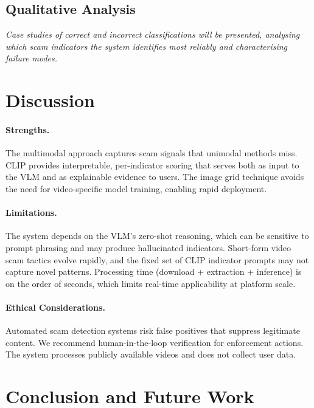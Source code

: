 \documentclass[12pt,a4paper]{article}
\begin{document}
\subsection{Qualitative Analysis}

\emph{Case studies of correct and incorrect classifications will be
presented, analysing which scam indicators the system identifies most
reliably and characterising failure modes.}

\section{Discussion}

\paragraph{Strengths.}
The multimodal approach captures scam signals that unimodal methods miss.
CLIP provides interpretable, per-indicator scoring that serves both as
input to the VLM and as explainable evidence to users. The image grid
technique avoids the need for video-specific model training, enabling
rapid deployment.

\paragraph{Limitations.}
The system depends on the VLM's zero-shot reasoning, which can be
sensitive to prompt phrasing and may produce hallucinated indicators.
Short-form video scam tactics evolve rapidly, and the fixed set of CLIP
indicator prompts may not capture novel patterns. Processing time
(download + extraction + inference) is on the order of seconds, which
limits real-time applicability at platform scale.

\paragraph{Ethical Considerations.}
Automated scam detection systems risk false positives that suppress
legitimate content. We recommend human-in-the-loop verification for
enforcement actions. The system processes publicly available videos and
does not collect user data.

\section{Conclusion and Future Work}
\end{document}
